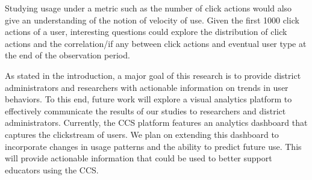 \documentclass{acm_proc_article-sp}
\begin{document}
Studying usage under a metric such as the number of click actions would also give an understanding of the notion of velocity of use. Given the first 1000 click actions of a user, interesting questions could explore the distribution of click actions and the correlation/if any between click actions and eventual user type at the end of the observation period.

As stated in the introduction, a major goal of this research is to provide district administrators and researchers with actionable information on trends in user behaviors. To this end, future work will explore a visual analytics platform to effectively communicate the results of our studies to researchers and district administrators. Currently, the CCS platform features an analytics dashboard that captures the clickstream of users. We plan on extending this dashboard to incorporate changes in usage patterns and the ability to predict future use. This will provide actionable information that could be used to better support educators using the CCS.


  
\end{document}
